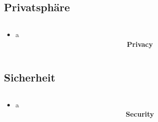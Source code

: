 \documentclass[
    ngerman,
    accentcolor=3b,
    dark_mode,
    fontsize= 12pt,
    a4paper,
    aspectratio=169,
    colorback=true,
    fancy_row_colors,
    leqno,
    fleqn,
    boxarc=3pt,
    fleqn,
]{algoslides}
\begin{document}
    \subsection{Privatsphäre}
    \begin{frame}[c]
        \slidehead{}
        \begin{columns}
            \begin{column}[c]{0.5\textwidth}
                \begin{itemize}
                    \item a
                \end{itemize}
            \end{column}
            \begin{column}[c]{0.5\textwidth}
                \begin{center}
                    \fontsize{50pt}{0pt}\selectfont\faUserSecret{}\\[0.2cm]
                    \normalsize\textbf{Privacy}
                \end{center}
            \end{column}
        \end{columns}
    \end{frame}
    \subsection{Sicherheit}
    \begin{frame}[c]
        \slidehead{}
        \begin{columns}
            \begin{column}[c]{0.5\textwidth}
                \begin{itemize}
                    \item a
                \end{itemize}
            \end{column}
            \begin{column}[c]{0.5\textwidth}
                \begin{center}
                    \fontsize{50pt}{0pt}\selectfont\faShield*{}\\[0.2cm]
                    \normalsize\textbf{Security}
                \end{center}
            \end{column}
        \end{columns}
    \end{frame}
\end{document}

